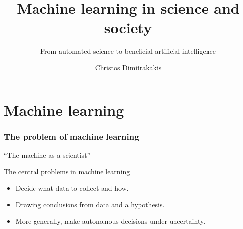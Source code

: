 \documentclass{beamer}
\title{Machine learning in science and society}
\subtitle{From automated science to beneficial artificial intelligence}
\author[C. Dimitrakakis]{Christos Dimitrakakis}
\begin{document}
\begin{frame}
  \titlepage
\end{frame}

\section{Machine learning}
 

\begin{frame}
  \frametitle{The problem of machine learning}
  \centering
  {\Large ``The machine as a scientist''}
  \vspace{1cm}
 
  \begin{block}{The central problems in machine learning}
    \begin{itemize}
    \item<1-> Decide \alert{what} data to collect and \alert{how}.
    \item<2-> Drawing \alert{conclusions} from data and a hypothesis.
    \item<3-> More generally, make \alert{autonomous decisions} under
      uncertainty.
    \end{itemize}
  \end{block}
\end{frame}
\end{document}
